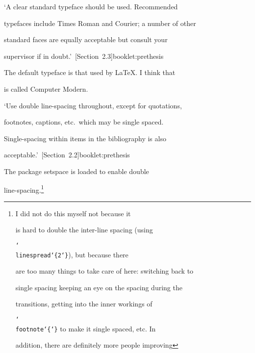 \documentclass{bhamthesis}
\makeatletter
\renewcommand{\cite}{\@ifstar{\@ifstar{\HAR@acite}{\HAR@fcite}}{\HAR@acite}}
\newcommand{\mm}{\mathrm{mm}}
\newcommand{\solnmark}{\textasteriskcentered}
\newcommand{\req}{\begin{singlespace}\small\item}
\newcommand{\soln}{\end{singlespace}\normalsize\item[\solnmark]}
\newcommand{\bksl}{\char`\\}
\newcommand{\cmd}[1]{\texttt{\bksl{}#1}}
\newcommand{\pkg}[1]{\textsf{#1}}
\newcommand{\textarg}{\char`\{\char`\}}
\makeatother
\begin{document}
\begin{itemize}







\req `A clear standard typeface should be used. Recommended

  typefaces include Times Roman and Courier; a number of other

  standard faces are equally acceptable but consult your

  supervisor if in doubt.'~\cite[Section~2.3]{booklet:prethesis}

\soln The default typeface is that used by \LaTeX.  I think that

  is called Computer Modern.



\req `Use double line-spacing throughout, except for quotations,

  footnotes, captions, etc.\ which may be single spaced.

  Single-spacing within items in the bibliography is also

  acceptable.'~\cite[Section~2.2]{booklet:prethesis}

\soln The package \pkg{setspace} is loaded to enable double

  line-spacing.\footnote{I did not do this myself not because it

  is hard to double the inter-line spacing (using

  \cmd{linespread\char`\{2\char`\}}), but because there

  are too many things to take care of here: switching back to

  single spacing keeping an eye on the spacing during the

  transitions, getting into the inner workings of

  \cmd{footnote\textarg} to make it single spaced, etc. In

  addition, there are definitely more people improving

}
\end{itemize}
\end{document}
